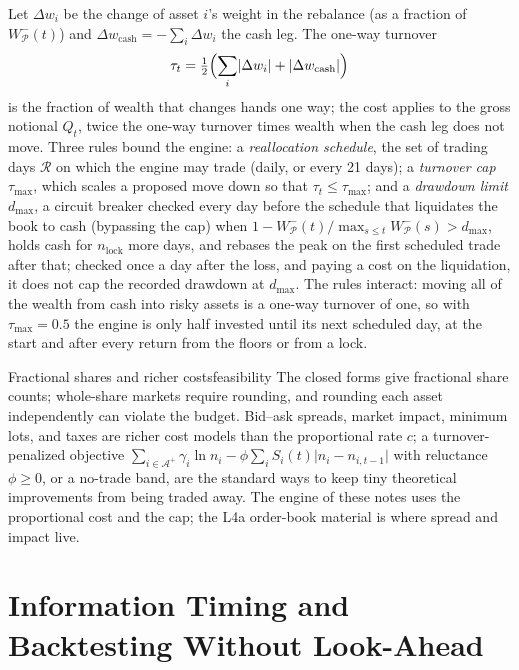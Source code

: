 \documentclass[11pt]{article}
\newcommand{\Ap}{\mathcal A^{+}}
\newcommand{\Rset}{\mathcal R}
\begin{document}
Let $\Delta w_i$ be the change of asset $i$'s weight in the rebalance (as a fraction of $W^-_{\mathcal P}(t)$) and $\Delta w_{\mathrm{cash}}=-\sum_i\Delta w_i$ the cash leg. The one-way turnover
\begin{equation}
  \label{eq:turnover}
  \tau_t=\tfrac12\Bigl(\sum_i\lvert\Delta w_i\rvert+\lvert\Delta w_{\mathrm{cash}}\rvert\Bigr)
\end{equation}
is the fraction of wealth that changes hands one way; the cost applies to the gross notional $Q_t$, twice the one-way turnover times wealth when the cash leg does not move. Three rules bound the engine: a \emph{reallocation schedule}, the set of trading days $\Rset$ on which the engine may trade (daily, or every 21 days); a \emph{turnover cap} $\tau_{\max}$, which scales a proposed move down so that $\tau_t\le\tau_{\max}$; and a \emph{drawdown limit} $d_{\max}$, a circuit breaker checked every day before the schedule that liquidates the book to cash (bypassing the cap) when $1-W^-_{\mathcal P}(t)/\max_{s\le t}W^-_{\mathcal P}(s)>d_{\max}$, holds cash for $n_{\mathrm{lock}}$ more days, and rebases the peak on the first scheduled trade after that; checked once a day after the loss, and paying a cost on the liquidation, it does not cap the recorded drawdown at $d_{\max}$. The rules interact: moving all of the wealth from cash into risky assets is a one-way turnover of one, so with $\tau_{\max}=0.5$ the engine is only half invested until its next scheduled day, at the start and after every return from the floors or from a lock.

\begin{remark}{Fractional shares and richer costs}{feasibility}
The closed forms give fractional share counts; whole-share markets require rounding, and rounding each asset independently can violate the budget. Bid--ask spreads, market impact, minimum lots, and taxes are richer cost models than the proportional rate $c$; a turnover-penalized objective $\sum_{i\in\Ap}\gamma_i\ln n_i-\phi\sum_iS_i(t)\lvert n_i-n_{i,t-1}\rvert$ with reluctance $\phi\ge0$, or a no-trade band, are the standard ways to keep tiny theoretical improvements from being traded away. The engine of these notes uses the proportional cost and the cap; the L4a order-book material is where spread and impact live.
\end{remark}

\section{Information Timing and Backtesting Without Look-Ahead}
\end{document}
